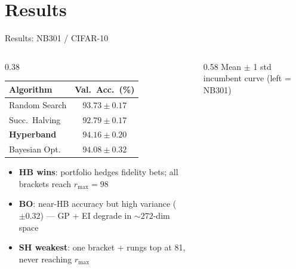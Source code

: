 \documentclass[t,english]{beamer}
\begin{document}
\section{Results}

\begin{frame}{Results: NB301 / CIFAR-10}
  \begin{columns}[T]
    \begin{column}{0.38\textwidth}
      \renewcommand{\tabcolsep}{3pt}
      \renewcommand{\arraystretch}{1.1}
      \begin{footnotesize}
      \begin{tabular}{lc}
        \toprule
        \textbf{Algorithm} & \textbf{Val.\ Acc.\ (\%)} \\
        \midrule
        Random Search            & $93.73 \pm 0.17$ \\
        Succ.\ Halving           & $92.79 \pm 0.17$ \\
        \textbf{Hyperband}       & $\mathbf{94.16 \pm 0.20}$ \\
        Bayesian Opt.            & $94.08 \pm 0.32$ \\
        \bottomrule
      \end{tabular}
      \end{footnotesize}

      \vspace{0.4em}
      \begin{itemize}\setlength\itemsep{3pt}
        \item[\small$\blacktriangleright$] {\scriptsize\textbf{HB wins}: portfolio hedges fidelity bets; all brackets reach $r_{\max}{=}98$}
        \item[\small$\blacktriangleright$] {\scriptsize\textbf{BO}: near-HB accuracy but \alert{high variance} ($\pm 0.32$) — GP + EI degrade in ${\sim}272$-dim space}
        \item[\small$\blacktriangleright$] {\scriptsize\textbf{SH weakest}: one bracket + rungs top at 81, never reaching $r_{\max}$}
      \end{itemize}
    \end{column}
    \begin{column}{0.58\textwidth}
      \vskip-8pt
      {\tiny Mean $\pm$ 1 std incumbent curve (left = NB301)}
    \end{column}
  \end{columns}
\end{frame}
\end{document}
